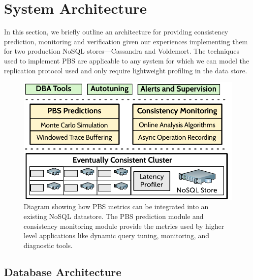 \section{System Architecture}
\label{sec:architecture}

In this section, we briefly outline an architecture for providing
consistency prediction, monitoring and verification given our experiences
implementing them for two production NoSQL stores---Cassandra and
Voldemort. The techniques used to implement PBS are applicable to any
system for which we can model the replication protocol used and only
require lightweight profiling in the data store.


\begin{figure}
\centering
\includegraphics[width=\columnwidth]{figs/cluster-arch.pdf}
\caption{Diagram showing how PBS metrics can be integrated into an
  existing NoSQL datastore. The PBS prediction module and consistency
  monitoring module provide the metrics used by higher level applications like
  dynamic query tuning, monitoring, and diagnostic tools.}
\label{fig:pbs-sys-arch}
\end{figure}


\subsection{Database Architecture}
\label{sec:dbarch}

